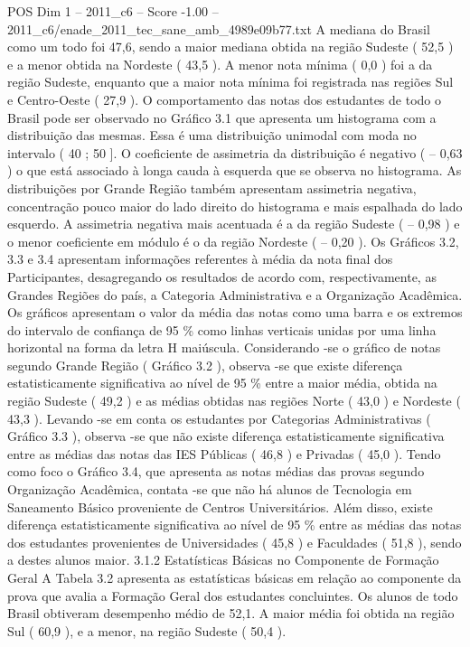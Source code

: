 \begin{textsample}{POS Dim 1 – 2011\_c6 – Score -1.00 – 2011\_c6/enade\_2011\_tec\_sane\_amb\_4989e09b77.txt}
A mediana do Brasil como um todo foi 47,6, sendo a maior mediana obtida na região Sudeste ( 52,5 ) e a menor obtida na Nordeste ( 43,5 ).
A menor nota mínima ( 0,0 ) foi a da região Sudeste, enquanto que a maior nota mínima foi registrada nas regiões Sul e Centro-Oeste ( 27,9 ).
O comportamento das notas dos estudantes de todo o Brasil pode ser observado no Gráfico 3.1 que apresenta um histograma com a distribuição das mesmas.
Essa é uma distribuição unimodal com moda no intervalo ( 40 ; 50 ].
O coeficiente de assimetria da distribuição é negativo ( – 0,63 ) o que está associado à longa cauda à esquerda que se observa no histograma.
As distribuições por Grande Região também apresentam assimetria negativa, concentração pouco maior do lado direito do histograma e mais espalhada do lado esquerdo.
A assimetria negativa mais acentuada é a da região Sudeste ( – 0,98 ) e o menor coeficiente em módulo é o da região Nordeste ( – 0,20 ).
Os Gráficos 3.2, 3.3 e 3.4 apresentam informações referentes à média da nota final dos Participantes, desagregando os resultados de acordo com, respectivamente, as Grandes Regiões do país, a Categoria Administrativa e a Organização Acadêmica.
Os gráficos apresentam o valor da média das notas como uma barra e os extremos do intervalo de confiança de 95 \% como linhas verticais unidas por uma linha horizontal na forma da letra H maiúscula.
Considerando -se o gráfico de notas segundo Grande Região ( Gráfico 3.2 ), observa -se que existe diferença estatisticamente significativa ao nível de 95 \% entre a maior média, obtida na região Sudeste ( 49,2 ) e as médias obtidas nas regiões Norte ( 43,0 ) e Nordeste ( 43,3 ).
Levando -se em conta os estudantes por Categorias Administrativas ( Gráfico 3.3 ), observa -se que não existe diferença estatisticamente significativa entre as médias das notas das IES Públicas ( 46,8 ) e Privadas ( 45,0 ).
Tendo como foco o Gráfico 3.4, que apresenta as notas médias das provas segundo Organização Acadêmica, contata -se que não há alunos de Tecnologia em Saneamento Básico proveniente de Centros Universitários.
Além disso, existe diferença estatisticamente significativa ao nível de 95 \% entre as médias das notas dos estudantes provenientes de Universidades ( 45,8 ) e Faculdades ( 51,8 ), sendo a destes alunos maior. 3.1.2 Estatísticas Básicas no Componente de Formação Geral A Tabela 3.2 apresenta as estatísticas básicas em relação ao componente da prova que avalia a Formação Geral dos estudantes concluintes.
Os alunos de todo Brasil obtiveram desempenho médio de 52,1.
A maior média foi obtida na região Sul ( 60,9 ), e a menor, na região Sudeste ( 50,4 ).

\end{textsample}
